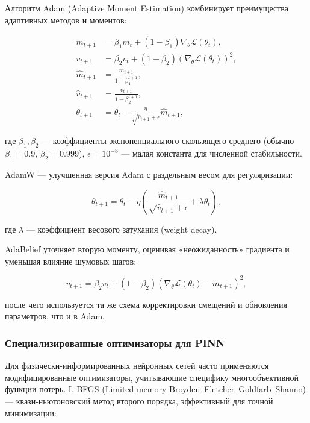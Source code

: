 Алгоритм Adam (Adaptive Moment Estimation) комбинирует преимущества адаптивных методов и моментов:

\begin{equation}
\begin{aligned}
m_{t+1} &= \beta_1 m_t + (1-\beta_1) \nabla_{\theta} \mathcal{L}(\theta_t), \\
v_{t+1} &= \beta_2 v_t + (1-\beta_2) (\nabla_{\theta} \mathcal{L}(\theta_t))^2, \\
\hat{m}_{t+1} &= \frac{m_{t+1}}{1-\beta_1^{t+1}}, \\
\hat{v}_{t+1} &= \frac{v_{t+1}}{1-\beta_2^{t+1}}, \\
\theta_{t+1} &= \theta_t - \frac{\eta}{\sqrt{\hat{v}_{t+1}} + \epsilon} \hat{m}_{t+1},
\end{aligned}
\end{equation}

где $\beta_1, \beta_2$ — коэффициенты экспоненциального скользящего среднего (обычно $\beta_1 = 0.9$, $\beta_2 = 0.999$), $\epsilon = 10^{-8}$ — малая константа для численной стабильности.

AdamW — улучшенная версия Adam с раздельным весом для регуляризации:

\begin{equation}
\theta_{t+1} = \theta_t - \eta \left( \frac{\hat{m}_{t+1}}{\sqrt{\hat{v}_{t+1}} + \epsilon} + \lambda \theta_t \right),
\end{equation}

где $\lambda$ — коэффициент весового затухания (weight decay).

AdaBelief уточняет вторую моменту, оценивая «неожиданность» градиента и уменьшая влияние шумовых шагов:

\begin{equation}
v_{t+1} = \beta_2 v_t + (1-\beta_2) \left( \nabla_{\theta} \mathcal{L}(\theta_t) - m_{t+1} \right)^2,
\end{equation}

после чего используется та же схема корректировки смещений и обновления параметров, что и в Adam.

\subsubsection{Специализированные оптимизаторы для PINN}

Для физически-информированных нейронных сетей часто применяются модифицированные оптимизаторы, учитывающие специфику многообъективной функции потерь. L-BFGS (Limited-memory Broyden–Fletcher–Goldfarb–Shanno) — квази-ньютоновский метод второго порядка, эффективный для точной минимизации:

